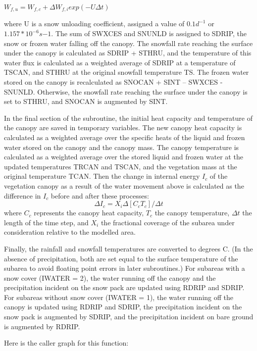 $W_{f,u} = {W_{f,c} + \Delta W_{f,i} } exp (-U \Delta t)$

where U is a snow unloading coefficient, assigned a value of $0.1 d^{-1}$ or $1.157 * 10^{-6} s{-1}$. The sum of S\+W\+X\+C\+E\+S and S\+N\+U\+N\+L\+D is assigned to S\+D\+R\+I\+P, the snow or frozen water falling off the canopy. The snowfall rate reaching the surface under the canopy is calculated as S\+D\+R\+I\+P + S\+T\+H\+R\+U, and the temperature of this water flux is calculated as a weighted average of S\+D\+R\+I\+P at a temperature of T\+S\+C\+A\+N, and S\+T\+H\+R\+U at the original snowfall temperature T\+S. The frozen water stored on the canopy is recalculated as S\+N\+O\+C\+A\+N + S\+I\+N\+T – S\+W\+X\+C\+E\+S -\/ S\+N\+U\+N\+L\+D. Otherwise, the snowfall rate reaching the surface under the canopy is set to S\+T\+H\+R\+U, and S\+N\+O\+C\+A\+N is augmented by S\+I\+N\+T.

In the final section of the subroutine, the initial heat capacity and temperature of the canopy are saved in temporary variables. The new canopy heat capacity is calculated as a weighted average over the specific heats of the liquid and frozen water stored on the canopy and the canopy mass. The canopy temperature is calculated as a weighted average over the stored liquid and frozen water at the updated temperatures T\+R\+C\+A\+N and T\+S\+C\+A\+N, and the vegetation mass at the original temperature T\+C\+A\+N. Then the change in internal energy $I_c$ of the vegetation canopy as a result of the water movement above is calculated as the difference in $I_c$ before and after these processes\+: \[ \Delta I_c = X_i \Delta [C_c T_c ] / \Delta t \] where $C_c$ represents the canopy heat capacity, $T_c$ the canopy temperature, $\Delta t$ the length of the time step, and $X_i$ the fractional coverage of the subarea under consideration relative to the modelled area.

Finally, the rainfall and snowfall temperatures are converted to degrees C. (In the absence of precipitation, both are set equal to the surface temperature of the subarea to avoid floating point errors in later subroutines.) For subareas with a snow cover (I\+W\+A\+T\+E\+R = 2), the water running off the canopy and the precipitation incident on the snow pack are updated using R\+D\+R\+I\+P and S\+D\+R\+I\+P. For subareas without snow cover (I\+W\+A\+T\+E\+R = 1), the water running off the canopy is updated using R\+D\+R\+I\+P and S\+D\+R\+I\+P, the precipitation incident on the snow pack is augmented by S\+D\+R\+I\+P, and the precipitation incident on bare ground is augmented by R\+D\+R\+I\+P.

Here is the caller graph for this function\+:


